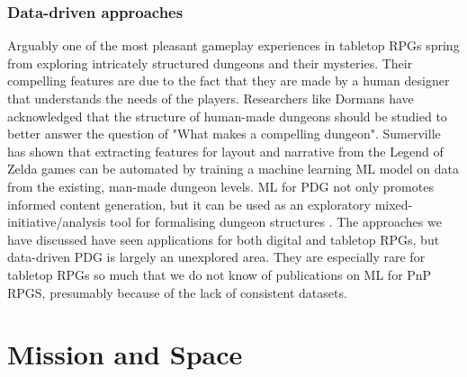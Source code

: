 \documentclass{UoYCSproject}
\begin{document}
\subsubsection{Data-driven approaches}
 Arguably one of the most pleasant gameplay experiences in tabletop RPGs spring from exploring intricately structured dungeons and their mysteries. Their compelling features are due to the fact that they are made by a human designer that understands the needs of the players. Researchers like Dormans have acknowledged that the structure of human-made dungeons should be studied to better answer the question of "What makes a compelling dungeon". Sumerville \parencite{SummervilleLearningOfZelda} has shown that extracting features for layout and narrative from the Legend of Zelda games can be automated by training a machine learning ML model on data from the existing, man-made dungeon levels. ML for PDG not only promotes informed content generation, but it can be used as an exploratory mixed-initiative/analysis tool for formalising dungeon structures \parencite{SummervillePCGML}. The approaches we have discussed have seen applications for both digital and tabletop RPGs, but data-driven PDG is largely an unexplored area. They are especially rare for tabletop RPGs so much that we do not know of publications on ML for PnP RPGS, presumably because of the lack of consistent datasets.

\section{Mission and Space}
\end{document}
